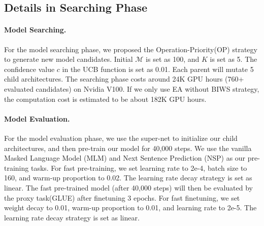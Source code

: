 \documentclass[letterpaper]{article} \usepackage{aaai22}  \usepackage{times}  \usepackage{helvet}  \usepackage{courier}  \usepackage[hyphens]{url}  \usepackage{graphicx} \urlstyle{rm} \def\UrlFont{\rm}  \usepackage{natbib}  \usepackage{caption} \DeclareCaptionStyle{ruled}{labelfont=normalfont,labelsep=colon,strut=off} \frenchspacing  \setlength{\pdfpagewidth}{8.5in}  \setlength{\pdfpageheight}{11in}  \usepackage{algorithm}
\begin{document}
\subsection{Details in Searching Phase}
\paragraph{Model Searching.}
For the model searching phase, we proposed the Operation-Priority(OP) strategy to generate new model candidates. Initial {$\mathcal{M}$} is set as 100, and $K$ is set as 5. The confidence value $c$ in the UCB function is set as 0.01. Each parent will mutate 5 child architectures. The searching phase costs around 24K GPU hours (760+ evaluated candidates) on Nvidia V100. If we only use EA without BIWS strategy, the computation cost is estimated to be about 182K GPU hours. 

\paragraph{Model Evaluation.}
For the model evaluation phase, we use the super-net to initialize our child architectures, and then pre-train our model for 40,000 steps. We use the vanilla Masked Language Model (MLM) and Next Sentence Prediction (NSP) as our pre-training tasks. For fast pre-training, we set learning rate to 2e-4, batch size to 160, and warm-up proportion to 0.02. The learning rate decay strategy is set as linear. The fast pre-trained model (after 40,000 steps) will then be evaluated by the proxy task(GLUE) after finetuning 3 epochs. For fast finetuning, we set weight decay to 0.01, warm-up proportion to 0.01, and learning rate to 2e-5. The learning rate decay strategy is set as linear.
\end{document}

